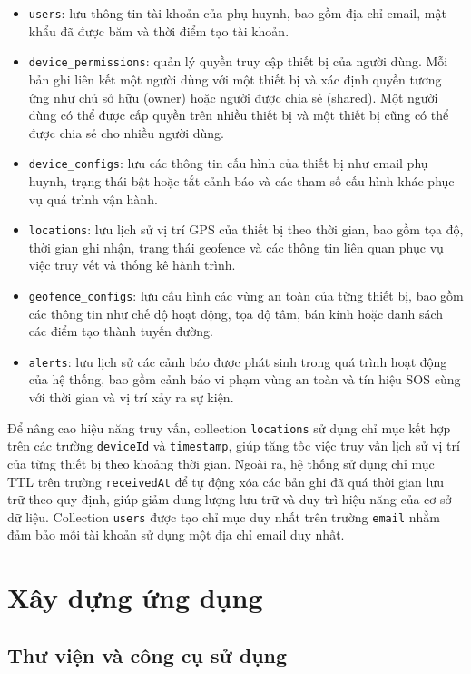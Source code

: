 \documentclass[../DoAn.tex]{subfiles}
\begin{document}
    \begin{itemize}
        \item \texttt{users}: lưu thông tin tài khoản của phụ huynh, bao gồm địa chỉ email, mật khẩu đã được băm và thời điểm tạo tài khoản.
        \item \texttt{device\_permissions}: quản lý quyền truy cập thiết bị của người dùng. Mỗi bản ghi liên kết một người dùng với một thiết bị và xác định quyền tương ứng như chủ sở hữu (owner) hoặc người được chia sẻ (shared). Một người dùng có thể được cấp quyền trên nhiều thiết bị và một thiết bị cũng có thể được chia sẻ cho nhiều người dùng.
        \item \texttt{device\_configs}: lưu các thông tin cấu hình của thiết bị như email phụ huynh, trạng thái bật hoặc tắt cảnh báo và các tham số cấu hình khác phục vụ quá trình vận hành.
        \item \texttt{locations}: lưu lịch sử vị trí GPS của thiết bị theo thời gian, bao gồm tọa độ, thời gian ghi nhận, trạng thái geofence và các thông tin liên quan phục vụ việc truy vết và thống kê hành trình.
        \item \texttt{geofence\_configs}: lưu cấu hình các vùng an toàn của từng thiết bị, bao gồm các thông tin như chế độ hoạt động, tọa độ tâm, bán kính hoặc danh sách các điểm tạo thành tuyến đường.
        \item \texttt{alerts}: lưu lịch sử các cảnh báo được phát sinh trong quá trình hoạt động của hệ thống, bao gồm cảnh báo vi phạm vùng an toàn và tín hiệu SOS cùng với thời gian và vị trí xảy ra sự kiện.
    \end{itemize}

    Để nâng cao hiệu năng truy vấn, collection \texttt{locations} sử dụng chỉ mục kết hợp trên các trường \texttt{deviceId} và \texttt{timestamp}, giúp tăng tốc việc truy vấn lịch sử vị trí của từng thiết bị theo khoảng thời gian. Ngoài ra, hệ thống sử dụng chỉ mục TTL trên trường \texttt{receivedAt} để tự động xóa các bản ghi đã quá thời gian lưu trữ theo quy định, giúp giảm dung lượng lưu trữ và duy trì hiệu năng của cơ sở dữ liệu. Collection \texttt{users} được tạo chỉ mục duy nhất trên trường \texttt{email} nhằm đảm bảo mỗi tài khoản sử dụng một địa chỉ email duy nhất.

    \section{Xây dựng ứng dụng}

    \subsection{Thư viện và công cụ sử dụng}
\end{document}
